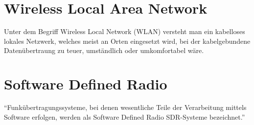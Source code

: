 \section{Wireless Local Area Network}
Unter dem Begriff Wireless Local Network (WLAN) versteht man ein kabelloses lokales Netzwerk, welches meist an Orten eingesetzt wird, bei der kabelgebundene Datenübertraung zu teuer, umständlich oder umkomfortabel wäre.

\section{Software Defined Radio} 
\enquote{Funkübertragungssysteme, bei denen wesentliche Teile der Verarbeitung mittels Software erfolgen, werden als Software Defined Radio \ac{SDR}-Systeme bezeichnet.} \cite[Heuberger, e. a., S. 1]{Heuberger:2017}


